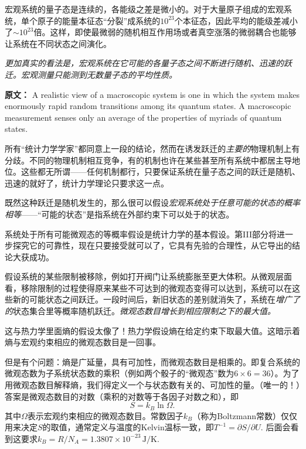 宏观系统的量子态是连续的，各能级之差是微小的。对于大量原子组成的宏观系统，单个原子的能量本征态“分裂”成系统的$10^{23}$个本征态，因此平均的能级差减小了$\sim 10^{23}$倍。这样，即使最微弱的随机相互作用场或者真空涨落的微弱耦合也能够让系统在不同状态之间演化。

{\it 
更加真实的看法是，宏观系统在它可能的各量子态之间不断进行随机、迅速的跃迁。宏观测量只能测到无数量子态的平均性质。

{\bf 原文：} A realistic view of a macroscopic system is one in which the system makes enormously rapid random transitions among its quantum states. A macroscopic measurement senses only an average of the properties of myriads of quantum states.
}

所有“统计力学学家”都同意上一段的结论，然而在诱发跃迁的{\it 主要的}物理机制上有分歧。不同的物理机制相互竞争，有的机制也许在某些甚至所有系统中都居主导地位。这些都无所谓——任何机制都行，只要保证系统在量子态之间的跃迁是随机、迅速的就好了，统计力学理论只要求这一点。

既然这种跃迁是随机发生的，那么很可以假设{\it 宏观系统处于任意可能的状态的概率相等}——“可能的状态”是指系统在外部约束下可以处于的状态。

系统处于所有可能微观态的等概率假设是统计力学的基本假设。第III部分将进一步探究它的可靠性，现在只要接受就可以了，它具有先验的合理性，从它导出的结论大获成功。

假设系统的某些限制被移除，例如打开阀门让系统膨胀至更大体积。从微观层面看，移除限制的过程使得原来某些不可达到的微观态变得可以达到，系统可以在这些新的可能状态之间跃迁。一段时间后，新旧状态的差别就消失了，系统在{\it 增广了的}状态集合里等概率随机跃迁。{\it 微观态数目增长到相应限制之下的最大值。}

这与热力学里面熵的假设太像了！热力学假设熵在给定约束下取最大值。这暗示着熵与宏观约束相应的微观态数目是一回事。

但是有个问题：熵是广延量，具有可加性，而微观态数目是相乘的。即复合系统的微观态数为子系统状态数的乘积（例如两个骰子的“微观态”数为$6 \times 6 = 36$）。为了用微观态数目解释熵，我们得定义一个与状态数有关的、可加性的量。（唯一的！）答案是微观态数目的对数（乘积的对数等于各因子对数之和），即
\begin{equation}
	S = k_B \ln \Omega.
\label{equ15.1}
\end{equation}
其中$\Omega$表示宏观约束相应的微观态数目。常数因子$k_B$（称为Boltzmann常数）仅仅用来决定$S$的取值，通常定义与温度的Kelvin温标一致，即$T^{-1} = \partial S / \partial U$. 后面会看到这要求$k_B = R/N_A = 1.3807 \times 10^{-23} \, \mathrm{J/K}$.

